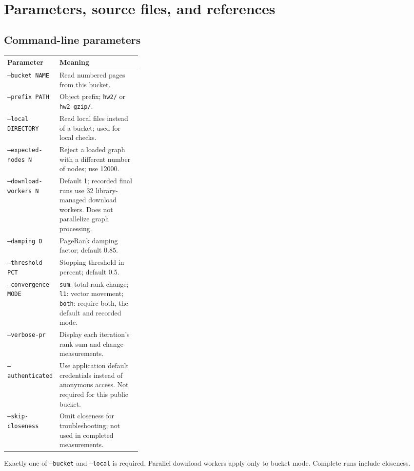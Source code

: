 \documentclass[10pt,letterpaper]{article}
\begin{document}
\section{Parameters, source files, and references}
\subsection{Command-line parameters}
\begin{tabularx}{\linewidth}{@{}p{0.32\linewidth}Y@{}}
\toprule Parameter & Meaning \\ \midrule
\texttt{--bucket NAME} & Read numbered pages from this bucket. \\
\texttt{--prefix PATH} & Object prefix; \texttt{hw2/} or \texttt{hw2-gzip/}. \\
\texttt{--local DIRECTORY} & Read local files instead of a bucket; used for local checks. \\
\texttt{--expected-nodes N} & Reject a loaded graph with a different number of nodes; use 12000. \\
\texttt{--download-workers N} & Default 1; recorded final runs use 32 library-managed download workers. Does not parallelize graph processing. \\
\texttt{--damping D} & PageRank damping factor; default 0.85. \\
\texttt{--threshold PCT} & Stopping threshold in percent; default 0.5. \\
\texttt{--convergence MODE} & \texttt{sum}: total-rank change; \texttt{l1}: vector movement; \texttt{both}: require both, the default and recorded mode. \\
\texttt{--verbose-pr} & Display each iteration's rank sum and change measurements. \\
\texttt{--authenticated} & Use application default credentials instead of anonymous access. Not required for this public bucket. \\
\texttt{--skip-closeness} & Omit closeness for troubleshooting; not used in completed measurements. \\
\bottomrule
\end{tabularx}
Exactly one of \texttt{--bucket} and \texttt{--local} is required. Parallel
download workers apply only to bucket mode. Complete runs include closeness.
\end{document}
